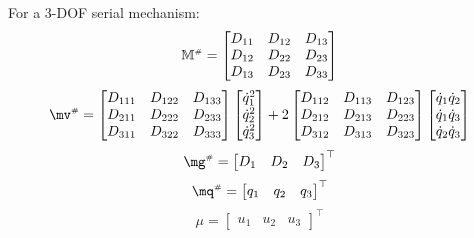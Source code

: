 \documentclass[a4paper,11pt,brazil,fleqn]{article}
\begin{document}
For a 3-DOF serial mechanism:
\begin{equation}
\mathbb{M}^{\scriptscriptstyle \#} = 
\begin{bmatrix}
D_{11} & D_{12} & D_{13} \\
D_{12} & D_{22} & D_{23} \\
D_{13} & D_{23} & D_{33} \\
\end{bmatrix}
\end{equation}
\begin{equation}
\mv\ssh = 
\begin{bmatrix}
D_{111} & D_{122} & D_{133} \\
D_{211} & D_{222} & D_{233} \\
D_{311} & D_{322} & D_{333} \\
\end{bmatrix}
\begin{bmatrix}
\dot{q}_1^2 \\
\dot{q}_2^2 \\
\dot{q}_3^2 \\
\end{bmatrix}
+
2\begin{bmatrix}
D_{112} & D_{113} & D_{123} \\
D_{212} & D_{213} & D_{223} \\
D_{312} & D_{313} & D_{323} \\
\end{bmatrix}
\begin{bmatrix}
\dot{q}_1 \dot{q}_2 \\
\dot{q}_1 \dot{q}_3 \\
\dot{q}_2 \dot{q}_3 \\
\end{bmatrix}
\end{equation}
\begin{equation}
\mg\ssh =
\begin{bmatrix}
D_1 &
D_2 &
D_3
\end{bmatrix}^\top
\end{equation}
\begin{equation}
\mq\ssh =
\begin{bmatrix}
q_1 &
q_2 &
q_3
\end{bmatrix}^\top
\end{equation}
\begin{equation}
\mu =
\begin{bmatrix}
u_1 &
u_2 &
u_3
\end{bmatrix}^\top
\end{equation}
\end{document}
